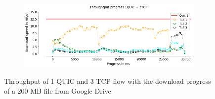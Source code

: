 \begin{frame}



\begin{figure}[!htb]
    \centering
    \begin{subfigure}{0.45\textwidth}
        \includegraphics[width=\linewidth]{./plots/PI/throughput/Throughtputprogress1QUIC+3TCP.png}
    \end{subfigure}    
    \caption{Throughput of 1 QUIC and 3 TCP flow with the download progress of a 200 MB file from Google Drive}
\end{figure}
\end{frame}
\clearpage

